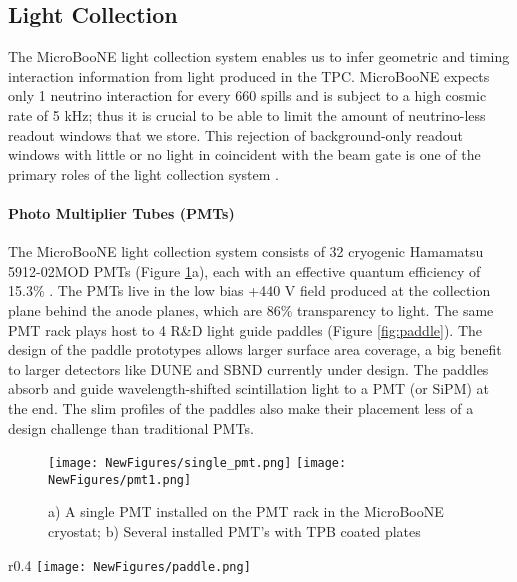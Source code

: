\documentclass[12pt]{article}
\begin{document}
\subsection{Light Collection}
\par The MicroBooNE light collection system enables us to infer geometric and timing interaction information from light produced in the TPC. MicroBooNE expects only 1 neutrino interaction for every 660 spills \cite{bib:first_nus} and is subject to a high cosmic rate of 5 kHz; thus it is crucial to be able to limit the amount of neutrino-less readout windows that we store. This rejection of background-only readout windows with little or no light in coincident with the beam gate is one of the primary roles of the light collection system \cite{bib:uboone_JINST}.

\paragraph{Photo Multiplier Tubes (PMTs)}

\par The MicroBooNE light collection system consists of 32 cryogenic Hamamatsu 5912-02MOD PMTs (Figure \ref{fig:pmt}a), each with an effective quantum efficiency of 15.3\% \cite{bib:ben_jones}. The PMTs live in the low bias +440 V field produced at the collection plane behind the anode planes, which are 86\% transparency to light.  The same PMT rack plays host to 4 R\&D light guide paddles (Figure \ref{fig:paddle}). The design of the paddle prototypes allows larger surface area coverage, a big benefit to larger detectors like DUNE and SBND currently under design. The paddles absorb and guide wavelength-shifted scintillation light to a PMT (or SiPM) at the end. The slim profiles of the paddles also make their placement less of a design challenge than traditional PMTs. 

\begin{figure}[h!]
\centering
\texttt{[image: NewFigures/single\_pmt.png]}
\hspace{3 mm}
\texttt{[image: NewFigures/pmt1.png]}
\caption{ a) A single PMT installed on the PMT rack in the MicroBooNE cryostat; b) Several installed PMT's with TPB coated plates  } 
\label{fig:pmt}
\end{figure}

\begin{wrapfigure}{r}{0.4\textwidth}
\centering
\texttt{[image: NewFigures/paddle.png]}
\caption{One of the 4 lightguide prototypes in the MicroBooNE PMT rack}
\label{fig:paddle}
\end{wrapfigure}
\end{document}
